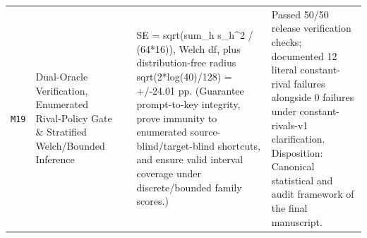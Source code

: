 {\begin{longtable}{@{}>{\raggedright\arraybackslash}p{0.9cm}>{\raggedright\arraybackslash}p{2.7cm}>{\raggedright\arraybackslash}p{1.7cm}>{\raggedright\arraybackslash}p{4.4cm}>{\raggedright\arraybackslash}p{4.7cm}@{}}
\texttt{M19} & Dual-\allowbreak{}Oracle Verification, Enumerated Rival-\allowbreak{}Policy Gate \& Stratified Welch/\allowbreak{}Bounded Inference & 029 & SE = sqrt(sum\_h s\_h\textasciicircum{}2 /\allowbreak{} (64*16)), Welch df, plus distribution-\allowbreak{}free radius sqrt(2*log(40)/\allowbreak{}128) = +/\allowbreak{}-\allowbreak{}24.01 pp. (Guarantee prompt-\allowbreak{}to-\allowbreak{}key integrity, prove immunity to enumerated source-\allowbreak{}blind/\allowbreak{}target-\allowbreak{}blind shortcuts, and ensure valid interval coverage under discrete/\allowbreak{}bounded family scores.) & Passed 50/\allowbreak{}50 release verification checks; documented 12 literal constant-\allowbreak{}rival failures alongside 0 failures under constant-\allowbreak{}rivals-\allowbreak{}v1 clarification. Disposition: Canonical statistical and audit framework of the final manuscript. \\[2pt]
\end{longtable}
}